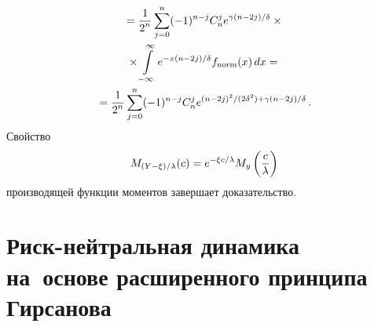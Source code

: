 \begin{multicols}{2}
\noindent
\begin{multline*}
{}=\displaystyle\frac{\displaystyle 1\mathstrut}{\displaystyle 2^n\mathstrut}\sum\limits^n_{j=0} (-1)^{n-j}C_n^j 
e^{{\gamma}(n-2j)/\delta}\times{}\\
{}\times \int\limits^\infty_{-\infty} 
e^{-{x}(n-2j)/\delta} f_{\mathrm{norm}}(x)\,dx={}\\
{}=\displaystyle\frac{\displaystyle 1\mathstrut}{\displaystyle 2^n\mathstrut}\sum\limits^n_{j=0} (-1)^{n-j}C_n^j 
e^{{(n-2j)^2}/({2\delta^2})+{\gamma(n-2j)}/{\delta}}\,.
\end{multline*}
Свойство 
$$
M_{({Y-\xi})/{\lambda}}(c)=e^{-{\xi c}/{\lambda}} M_y\left( 
\displaystyle\frac{\displaystyle c\mathstrut}{\displaystyle \lambda\mathstrut}\right)
$$
 производящей функции моментов завершает доказательство.

\section{Риск-нейтральная динамика на~основе расширенного 
принципа Гирсанова}


\end{multicols}
